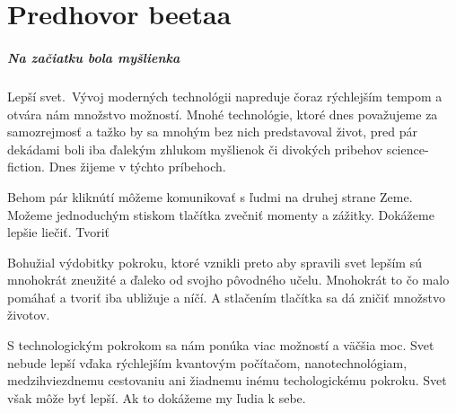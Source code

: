 \chapter{Predhovor beetaa}

\paragraph{Na začiatku bola myšlienka}
Lepší svet.\
Vývoj moderných technológii napreduje čoraz rýchlejším tempom a otvára nám množstvo možností. Mnohé technológie, ktoré dnes považujeme za samozrejmosť a tažko by sa mnohým bez nich predstavoval život, pred pár dekádami boli iba ďalekým zhlukom myšlienok či divokých pribehov science-fiction. Dnes žijeme v týchto príbehoch. \

Behom pár kliknútí môžeme komunikovať s ľudmi na druhej strane Zeme. Možeme jednoduchým stiskom tlačítka zvečniť momenty a zážitky. Dokážeme lepšie liečiť. Tvoriť

Bohužial výdobitky pokroku, ktoré vznikli preto aby spravili svet lepším sú mnohokrát zneužité a ďaleko od svojho pôvodného učelu. Mnohokrát to čo malo pomáhať a tvoriť iba ubližuje a níčí. A stlačením tlačítka sa dá zničiť množstvo životov. \


S technologickým pokrokom sa nám ponúka viac možností a väčšia moc. Svet nebude lepší vďaka rýchlejším kvantovým počítačom, nanotechnológiam, medzihviezdnemu cestovaniu ani žiadnemu inému techologickému pokroku. Svet však môže byť lepší. Ak to dokážeme my ľudia k sebe.








